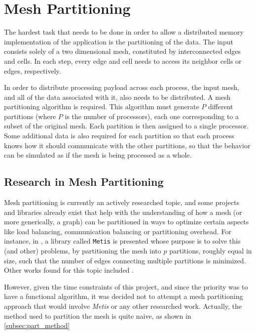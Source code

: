 \section{Mesh Partitioning}
\label{sec:partitioning}

The hardest task that needs to be done in order to allow a distributed memory implementation of the application is the partitioning of the data. The input consists solely of a two dimensional mesh, constituted by interconnected edges and cells. In each step, every edge and cell needs to access its neighbor cells or edges, respectively.

In order to distribute processing payload across each process, the input mesh, and all of the data associated with it, also needs to be distributed. A mesh partitioning algorithm is required. This algorithm must generate $P$ different partitions (where $P$ is the number of processors), each one corresponding to a subset of the original mesh. Each partition is then assigned to a single processor. Some additional data is also required for each partition so that each process knows how it should communicate with the other partitions, so that the behavior can be simulated as if the mesh is being processed as a whole.

\subsection{Research in Mesh Partitioning}
\label{subsec:part_research}

Mesh partitioning is currently an actively researched topic, and some projects and libraries already exist that help with the understanding of how a mesh (or more generically, a graph) can be partitioned in ways to optimize certain aspects like load balancing, communication balancing or partitioning overhead. For instance, in \cite{metis}, a library called \texttt{Metis} is presented whose purpose is to solve this (and other) problems, by partitioning the mesh into $p$ partitions, roughly equal in size, such that the number of edges connecting multiple partitions is minimized. Other works found for this topic included \cite{gilbert1995,walshaw2000}.

However, given the time constraints of this project, and since the priority was to have a functional algorithm, it was decided not to attempt a mesh partitioning approach that would involve \textit{Metis} or any other researched work. Actually, the method used to partition the mesh is quite naive, as shown in \cref{subsec:part_method}

